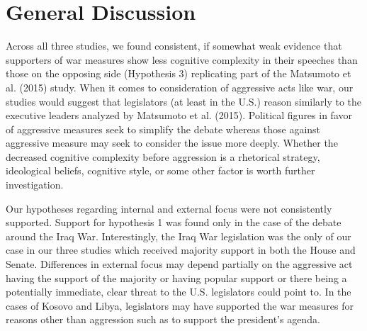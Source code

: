 \documentclass[english,,man,floatsintext]{apa6}
\begin{document}
\hypertarget{general-discussion}{%
\section{General Discussion}\label{general-discussion}}

Across all three studies, we found consistent, if somewhat weak evidence that supporters of war measures show less cognitive complexity in their speeches than those on the opposing side (Hypothesis 3) replicating part of the Matsumoto et al. (2015) study. When it comes to consideration of aggressive acts like war, our studies would suggest that legislators (at least in the U.S.) reason similarly to the executive leaders analyzed by Matsumoto et al. (2015). Political figures in favor of aggressive measures seek to simplify the debate whereas those against aggressive measure may seek to consider the issue more deeply. Whether the decreased cognitive complexity before aggression is a rhetorical strategy, ideological beliefs, cognitive style, or some other factor is worth further investigation.

Our hypotheses regarding internal and external focus were not consistently supported. Support for hypothesis 1 was found only in the case of the debate around the Iraq War. Interestingly, the Iraq War legislation was the only of our case in our three studies which received majority support in both the House and Senate. Differences in external focus may depend partially on the aggressive act having the support of the majority or having popular support or there being a potentially immediate, clear threat to the U.S. legislators could point to. In the cases of Kosovo and Libya, legislators may have supported the war measures for reasons other than aggression such as to support the president's agenda.
\end{document}
